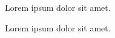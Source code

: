 \documentclass{article}
\begin{document}
Lorem ipsum dolor sit amet.

Lorem ipsum dolor sit amet.
\end{document}
